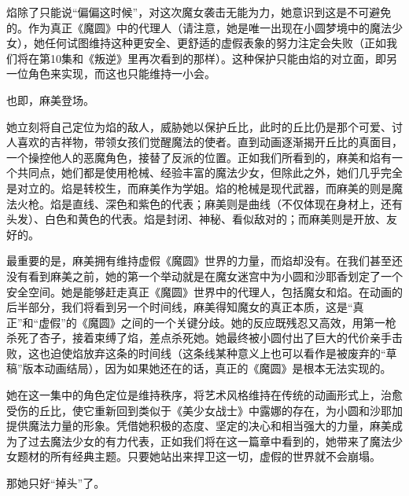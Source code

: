 焰除了只能说“偏偏这时候”，对这次魔女袭击无能为力，她意识到这是不可避免的。作为真正《魔圆》中的代理人（请注意，她是唯一出现在小圆梦境中的魔法少女），她任何试图维持这种更安全、更舒适的虚假表象的努力注定会失败（正如我们将在第10集和《叛逆》里再次看到的那样）。这种保护只能由焰的对立面，即另一位角色来实现，而这也只能维持一小会。

也即，麻美登场。

她立刻将自己定位为焰的敌人，威胁她以保护丘比，此时的丘比仍是那个可爱、讨人喜欢的吉祥物，带领女孩们觉醒魔法的使者。直到动画逐渐揭开丘比的真面目，一个操控他人的恶魔角色，接替了反派的位置。正如我们所看到的，麻美和焰有一个共同点，她们都是使用枪械、经验丰富的魔法少女，但除此之外，她们几乎完全是对立的。焰是转校生，而麻美作为学姐。焰的枪械是现代武器，而麻美的则是魔法火枪。焰是直线、深色和紫色的代表；麻美则是曲线（不仅体现在身材上，还有头发）、白色和黄色的代表。焰是封闭、神秘、看似敌对的；而麻美则是开放、友好的。

最重要的是，麻美拥有维持虚假《魔圆》世界的力量，而焰却没有。在我们甚至还没有看到麻美之前，她的第一个举动就是在魔女迷宫中为小圆和沙耶香划定了一个安全空间。她是能够赶走真正《魔圆》世界中的代理人，包括魔女和焰。在动画的后半部分，我们将看到另一个时间线，麻美得知魔女的真正本质，这是“真正”和“虚假”的《魔圆》之间的一个关键分歧。她的反应既残忍又高效，用第一枪杀死了杏子，接着束缚了焰，差点杀死她。她最终被小圆付出了巨大的代价亲手击败，这也迫使焰放弃这条的时间线（这条线某种意义上也可以看作是被废弃的“草稿”版本动画结局），因为如果她还在的话，真正的《魔圆》是根本无法实现的。

她在这一集中的角色定位是维持秩序，将艺术风格维持在传统的动画形式上，治愈受伤的丘比，使它重新回到类似于《美少女战士》中露娜的存在，为小圆和沙耶加提供魔法力量的形象。凭借她积极的态度、坚定的决心和相当强大的力量，麻美成为了过去魔法少女的有力代表，正如我们将在这一篇章中看到的，她带来了魔法少女题材的所有经典主题。只要她站出来捍卫这一切，虚假的世界就不会崩塌。

那她只好“掉头”了。





